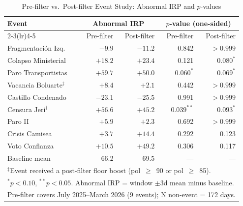 \documentclass[12pt,a4paper]{article}
\begin{document}
\begin{table}[h!]
\centering
\caption{Pre-filter vs.\ Post-filter Event Study: Abnormal IRP and $p$-values}
\label{tab:event_study_prefilter}
\small
\begin{tabular}{lrrrr}
\toprule
Event & \multicolumn{2}{c}{Abnormal IRP} & \multicolumn{2}{c}{$p$-value (one-sided)} \\
\cmidrule(lr){2-3}\cmidrule(lr){4-5}
      & Pre-filter & Post-filter & Pre-filter & Post-filter \\
\midrule
Fragmentaci\'on Izq.  & $-9.9$  & $-11.2$ & 0.842 & $>0.999$ \\
Colapso Ministerial   & $+18.2$ & $+23.4$ & 0.121 & $0.080^{*}$ \\
Paro Transportistas   & $+59.7$ & $+50.0$ & $0.060^{*}$ & $0.069^{*}$ \\
Vacancia Boluarte$^\ddagger$     & $+8.4$  & $+2.1$  & 0.442 & $>0.999$ \\
Castillo Condenado    & $-23.1$ & $-25.5$ & 0.991 & $>0.999$ \\
Censura Jeri$^\ddagger$          & $+56.6$ & $+45.2$ & $0.039^{**}$ & $0.093^{*}$ \\
Paro II               & $+5.9$  & $+2.3$  & 0.692 & $>0.999$ \\
Crisis Camisea        & $+3.7$  & $+14.4$ & 0.292 & 0.123 \\
Voto Confianza        & $+10.5$ & $+49.2$ & 0.306 & 0.117 \\
\midrule
Baseline mean & 66.2 & 69.5 & --- & --- \\
\bottomrule
\multicolumn{5}{l}{\footnotesize $^\ddagger$Event received a post-filter floor boost (pol~$\geq$~90 or pol~$\geq$~85).} \\
\multicolumn{5}{l}{\footnotesize $^{*}p<0.10$, $^{**}p<0.05$. Abnormal IRP = window $\pm$3d mean minus baseline.} \\
\multicolumn{5}{l}{\footnotesize Pre-filter covers July 2025--March 2026 (9 events); N non-event = 172 days.}
\end{tabular}
\end{table}
\end{document}
